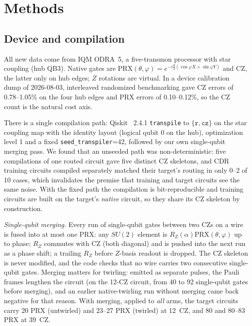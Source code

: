 \documentclass[conference]{IEEEtran}
\newcommand{\PRX}{\mathrm{PRX}}
\begin{document}
\section{Methods}\label{sec:methods}

\subsection{Device and compilation}
All new data come from IQM ODRA~5, a five-transmon processor with star coupling (hub QB3).
Native gates are $\PRX(\theta,\varphi)=e^{-i\frac\theta2(\cos\varphi X+\sin\varphi Y)}$ and CZ,
the latter only on hub edges; $Z$ rotations are virtual. In a device calibration dump of
2026-08-03, interleaved randomized benchmarking gave CZ errors of 0.78--1.05\% on the four hub
edges and PRX errors of 0.10--0.12\%, so the CZ count is the natural cost axis.

There is a single compilation path: Qiskit~\cite{qiskit2024} 2.4.1 \texttt{transpile} to
$\{\texttt{r},\texttt{cz}\}$ on the star coupling map with the identity layout (logical qubit 0 on
the hub), optimization level 1 and a fixed \texttt{seed\_transpiler}=42, followed by our own
single-qubit merging pass. We found that an unseeded path was non-deterministic: five
compilations of one routed circuit gave five distinct CZ skeletons, and CDR training circuits
compiled separately matched their target's routing in only 0--2 of 10 cases, which invalidates
the premise that training and target circuits see the same noise. With the fixed path the
compilation is bit-reproducible and training circuits are built on the target's
\emph{native} circuit, so they share its CZ skeleton by construction.

\emph{Single-qubit merging.} Every run of single-qubit gates between two CZs on a wire is fused
into at most one PRX: any $SU(2)$ element is $R_Z(\alpha)\PRX(\theta,\varphi)$ up to phase;
$R_Z$ commutes with CZ (both diagonal) and is pushed into the next run as a phase shift; a
trailing $R_Z$ before $Z$-basis readout is dropped. The CZ skeleton is never modified, and the
code checks that no wire carries two consecutive single-qubit gates. Merging matters for
twirling: emitted as separate pulses, the Pauli frames lengthen the circuit (on the 12-CZ
circuit, from 40 to 92 single-qubit gates before merging), and an earlier native-twirling run
without merging came back negative for that reason. With merging, applied to \emph{all} arms,
the target circuits carry 20 PRX (untwirled) and 23--27 PRX (twirled) at 12~CZ, and 80 and
80--83 PRX at 39~CZ.
\end{document}
